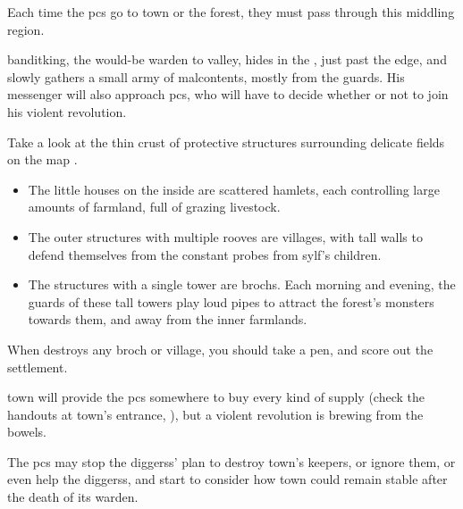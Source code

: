 \label{sqList}

\begin{multicols}{2}
\noindent
Each time the \glspl{pc} go to \gls{town} or the forest, they must pass through this middling \gls{region}.

\Gls{banditking}, the would-be \gls{warden} to \gls{valley}, hides in the , just past the \gls{edge}, and slowly gathers a small army of malcontents, mostly from the \glspl{guard}.
His messenger will also approach \glspl{pc}, who will have to decide whether or not to join his violent revolution.

Take a look at the thin crust of protective structures surrounding delicate fields on the map .

\begin{itemize}
  \item
  The little houses on the inside are scattered hamlets, each controlling large amounts of farmland, full of grazing livestock.
  \item
  The outer structures with multiple rooves are \glspl{village}, with tall walls to defend themselves from the constant probes from \gls{sylf}'s children.
  \item
  The structures with a single tower are \glspl{broch}.
  Each morning and evening, the \glspl{guard} of these tall towers play loud pipes to attract the forest's \glspl{monster} towards them, and away from the inner farmlands.
\end{itemize}

When  destroys any \gls{broch} or \gls{village}, you should take a pen, and score out the settlement.

\end{multicols}


\begin{multicols}{2}
\noindent
\Gls{town} will provide the \glspl{pc} somewhere to buy every kind of supply (check the handouts at \gls{town}'s entrance, ), but a violent revolution is brewing from the bowels.

The \glspl{pc} may stop the \glspl{diggers}' plan to destroy \gls{town}'s \glspl{keeper}, or ignore them, or even help the \glspl{diggers}, and start to consider how \gls{town} could remain stable after the death of its \gls{warden}.
\end{multicols}

\bigLine

